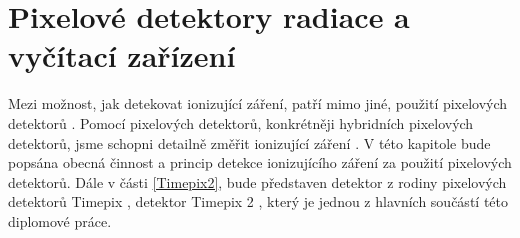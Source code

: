 \chapter{Pixelové detektory radiace a vyčítací zařízení}	%
\label{kap:2}
Mezi možnost, jak detekovat ionizující záření, patří mimo jiné, použití pixelových detektorů \cite{Grupen_Shwartz_2008}. Pomocí pixelových detektorů, konkrétněji hybridních pixelových detektorů, jsme schopni detailně změřit ionizující záření \cite{Rossi2006}. V této kapitole bude popsána obecná činnost a princip detekce ionizujícího záření za použití pixelových detektorů. Dále v části \ref{Timepix2}, bude představen detektor z rodiny pixelových detektorů Timepix \cite{Llopart}, detektor Timepix 2 \cite{tpx2_manual}, který je jednou z hlavních součástí této diplomové práce.

